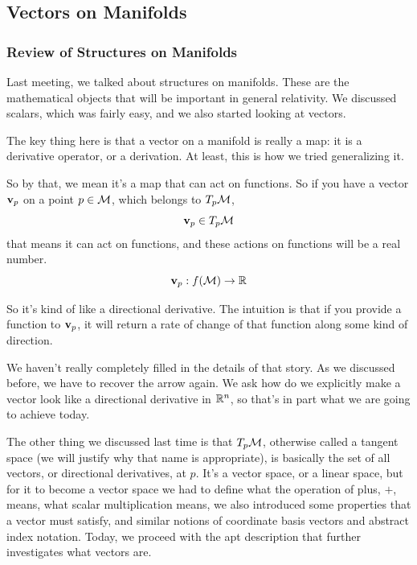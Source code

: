 
\subsection{Vectors on Manifolds}

	\subsubsection{Review of Structures on Manifolds}

		Last meeting, we talked about structures on manifolds.
		These are the mathematical objects that will be important
		in general relativity. We discussed scalars, which was
		fairly easy, and we also started looking at vectors.

		The key thing here is that a vector on a manifold is really
		a map: it is a derivative operator, or a derivation. At least,
		this is how we tried generalizing it.

		So by that, we mean it's a map that can act on functions. So
		if you have a vector $\vb{v}_p$ on a point $p\in\mathcal M$, which belongs to $T_p \mathcal M$,
		\begin{equation}
			\vb{v}_p \in T_p \mathcal{M} 
		\end{equation}
		that means it can act on functions, and these actions on functions will
		be a real number.
		\[
			\vb{v}_p: f(\mathcal M) \to \mathbb{R}
		\]

		So it's kind of like a directional derivative. The
		intuition is that if you provide a function to $\vb{v}_p$,
		it will return a rate of change of that function along some kind
		of direction.

		We haven't really completely filled in the details of that
		story. As we discussed before, we have to recover the arrow again. We
		ask how do we explicitly make a vector look like a directional
		derivative in $\mathbb{R}^n$, so that's in part what we are going to
		achieve today.

		The other thing we discussed last time is that $T_p \mathcal{M}$, otherwise called
		a tangent space (we will justify why that name is appropriate), is basically
		the set of all vectors, or directional derivatives, at $p$. It's a vector space, or a
		linear space, but for it to become a vector space we had to define what the
		operation of plus, $+$, means, what scalar multiplication means, we also 
		introduced some properties that a vector must satisfy, and similar notions
		of coordinate basis vectors and abstract index notation. Today, we proceed
		with the apt description that further investigates what vectors are.
		\newpage
